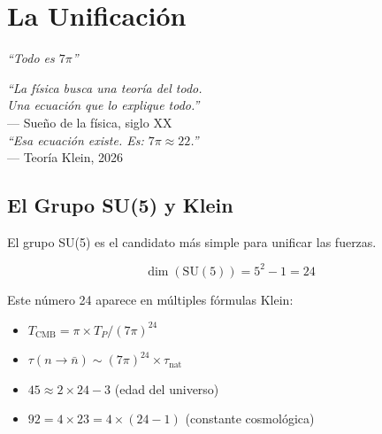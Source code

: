 \chapter{La Unificación}
\label{cap:unificacion}

\begin{center}
\textit{``Todo es $7\pi$''}
\end{center}

\vspace{0.5cm}

\begin{tcolorbox}[colback=white, colframe=kleinblue, boxrule=2pt]
\centering
\textit{``La física busca una teoría del todo.\\
Una ecuación que lo explique todo.''}\\
--- Sueño de la física, siglo XX\\[0.3cm]
\textit{``Esa ecuación existe. Es: $7\pi \approx 22$.''}\\
--- Teoría Klein, 2026
\end{tcolorbox}


\section{El Grupo SU(5) y Klein}

El grupo SU(5) es el candidato más simple para unificar las fuerzas.

\begin{equation}
\dim(\text{SU}(5)) = 5^2 - 1 = 24
\end{equation}

Este número 24 aparece en múltiples fórmulas Klein:

\begin{itemize}
    \item $T_{\text{CMB}} = \pi \times T_P / (7\pi)^{24}$
    \item $\tau(n \to \bar{n}) \sim (7\pi)^{24} \times \tau_{\text{nat}}$
    \item $45 \approx 2 \times 24 - 3$ (edad del universo)
    \item $92 = 4 \times 23 = 4 \times (24-1)$ (constante cosmológica)
\end{itemize}

